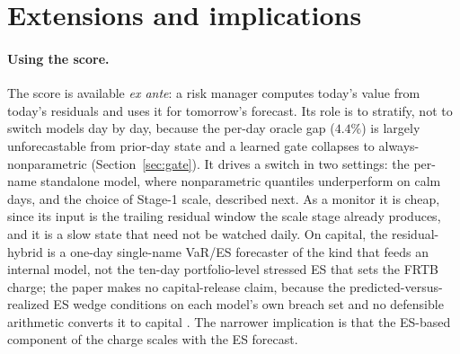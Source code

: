 \documentclass[11pt]{article}
\theoremstyle{remark}
\begin{document}
\section{Extensions and implications}\label{sec:applications}



\paragraph{Using the score.} The score is available \emph{ex ante}: a
risk manager computes today's value from today's residuals and uses it
for tomorrow's forecast. Its role is to stratify, not to switch models
day by day, because the per-day oracle gap ($4.4\%$) is largely unforecastable from
prior-day state and a learned gate collapses to always-nonparametric
(Section~\ref{sec:gate}). It drives a switch in two settings: the per-name
standalone model, where nonparametric quantiles underperform
on calm days, and the choice of Stage-1 scale, described next. As a monitor it is cheap, since its input is the trailing
residual window the scale stage already produces, and it is a slow state
that need not be watched daily. On capital, the residual-hybrid is a
one-day single-name VaR/ES forecaster of the kind that feeds an internal
model, not the ten-day portfolio-level stressed ES that sets the FRTB
charge; the paper makes no capital-release claim, because the
predicted-versus-realized ES wedge conditions on each model's own breach
set and no defensible arithmetic converts it to capital
\citep{bcbs2019frtb}. The narrower implication is that the ES-based
component of the charge scales with the ES forecast.
\end{document}

